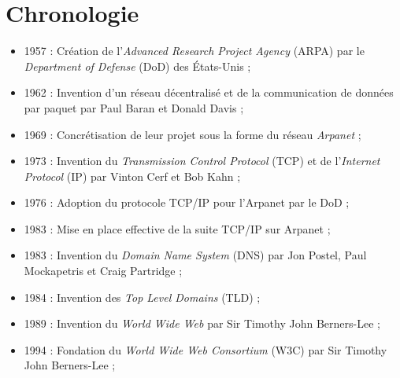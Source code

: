 \section{Chronologie}

\begin{itemize}
    \item 1957 : Création de l'\emph{Advanced Research Project Agency} (ARPA) par le \emph{Department of Defense} (DoD) des États-Unis ;
    \item 1962 : Invention d'un réseau décentralisé et de la communication de données par paquet par Paul Baran et Donald Davis ;
    \item 1969 : Concrétisation de leur projet sous la forme du réseau \emph{Arpanet} ;
    \item 1973 : Invention du \emph{Transmission Control Protocol} (TCP) et de l'\emph{Internet Protocol} (IP) par Vinton Cerf et Bob Kahn ;
    \item 1976 : Adoption du protocole TCP/IP pour l'Arpanet par le DoD ;
    \item 1983 : Mise en place effective de la suite TCP/IP sur Arpanet ;
    \item 1983 : Invention du \emph{Domain Name System} (DNS) par Jon Postel, Paul Mockapetris et Craig Partridge ;
    \item 1984 : Invention des \emph{Top Level Domains} (TLD) ;
    \item 1989 : Invention du \emph{World Wide Web} par Sir Timothy John Berners-Lee ;
    \item 1994 : Fondation du \emph{World Wide Web Consortium} (W3C) par Sir Timothy John Berners-Lee ;
\end{itemize}